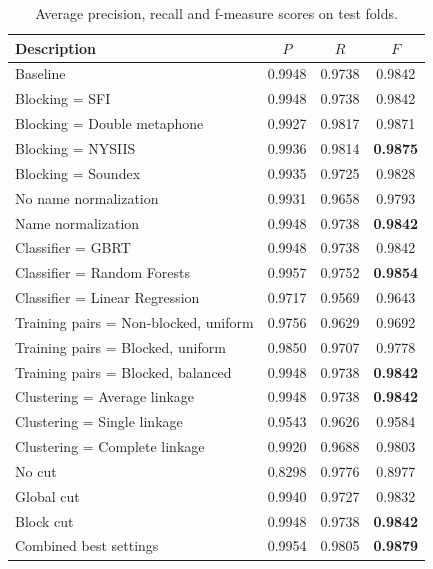 \documentclass[conference]{IEEEtran}
\begin{document}
\begin{table}
\caption{Average precision, recall and f-measure scores on test folds.}
\label{table:results}
\centering
\begin{tabular}{|l|c c c|}
  \hline
  \textbf{Description} & $P$ & $R$ & $F$\\
  \hline
  \hline
Baseline & 0.9948 & 0.9738 & 0.9842 \\
\hline
Blocking = SFI & 0.9948 & 0.9738 & 0.9842 \\
Blocking = Double metaphone & 0.9927 & 0.9817 & 0.9871 \\
Blocking = NYSIIS  & 0.9936 & 0.9814 & \textbf{0.9875} \\
Blocking = Soundex & 0.9935 & 0.9725 & 0.9828 \\
\hline
No name normalization & 0.9931 & 0.9658 & 0.9793 \\
Name normalization& 0.9948 & 0.9738 & \textbf{0.9842} \\
\hline
Classifier = GBRT & 0.9948 & 0.9738 & 0.9842 \\
Classifier = Random Forests & 0.9957 & 0.9752 & \textbf{0.9854} \\
Classifier = Linear Regression & 0.9717 & 0.9569 & 0.9643 \\
\hline
Training pairs = Non-blocked, uniform & 0.9756 & 0.9629 & 0.9692 \\
Training pairs = Blocked, uniform & 0.9850 & 0.9707 & 0.9778 \\
Training pairs = Blocked, balanced  & 0.9948 & 0.9738 & \textbf{0.9842} \\
\hline
Clustering = Average linkage& 0.9948 & 0.9738 & \textbf{0.9842} \\
Clustering = Single linkage & 0.9543 & 0.9626 & 0.9584 \\
Clustering = Complete linkage & 0.9920 & 0.9688 & 0.9803 \\
\hline
No cut& 0.8298 & 0.9776 & 0.8977 \\
Global cut & 0.9940 & 0.9727 & 0.9832 \\
Block cut& 0.9948 & 0.9738 & \textbf{0.9842} \\
\hline
Combined best settings & 0.9954 & 0.9805 & \textbf{0.9879} \\
  \hline
\end{tabular}
\end{table}
\end{document}
